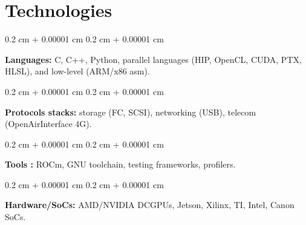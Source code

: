 \documentclass[10pt, letterpaper]{article}
\newenvironment{onecolentry}{
    \begin{adjustwidth}{
        0.2 cm + 0.00001 cm
    }{
        0.2 cm + 0.00001 cm
    }
}{
    \end{adjustwidth}
} %
\begin{document}
    \section{Technologies}        
        \begin{onecolentry}
          
            \textbf{Languages:} C, C++, Python, parallel languages (HIP, OpenCL, CUDA, PTX, HLSL), and low-level (ARM/x86 asm).
        \end{onecolentry}

        \vspace{0.2 cm}
        \begin{onecolentry}
            \textbf{Protocols stacks:} storage (FC, SCSI), networking (USB), telecom (OpenAirInterface 4G). 
        \end{onecolentry}

        \vspace{0.2 cm}
        \begin{onecolentry}
            \textbf{Tools :} ROCm, GNU toolchain, testing frameworks, profilers. 
        \end{onecolentry}

        \vspace{0.2 cm}
        \begin{onecolentry}
            \textbf{Hardware/SoCs:} AMD/NVIDIA DCGPUs, Jetson, Xilinx, TI, Intel, Canon SoCs.
        \end{onecolentry}
\end{document}
